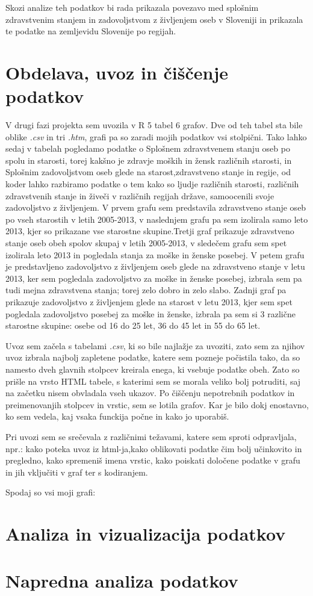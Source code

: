 \documentclass[11pt,a4paper]{article}
\begin{document}
Skozi analize teh podatkov bi rada prikazala povezavo med splošnim zdravstvenim stanjem in zadovoljstvom z življenjem oseb v Sloveniji in prikazala te podatke na zemljevidu Slovenije po regijah.
\newpage
\section{Obdelava, uvoz in čiščenje podatkov}
V drugi fazi projekta sem uvozila v R 5 tabel 6 grafov. Dve od teh tabel sta bile oblike \textit{.csv} in tri \textit{.htm}, grafi pa so zaradi mojih podatkov vsi stolpični. Tako lahko sedaj v tabelah pogledamo podatke o Splošnem zdravstvenem stanju oseb po spolu in starosti, torej kakšno je zdravje moških in žensk različnih starosti, in Splošnim zadovoljstvom oseb glede na starost,zdravstveno stanje in regije, od koder lahko razbiramo podatke o tem kako so ljudje različnih starosti, različnih zdravstvenih stanje in živeči v različnih regijah države, samoocenili svoje zadovoljstvo z življenjem. V prvem grafu sem predstavila zdravstveno stanje oseb po vseh starostih v letih 2005-2013, v naslednjem grafu pa sem izolirala samo leto 2013, kjer so prikazane vse starostne skupine.Tretji graf prikazuje zdravstveno stanje oseb obeh spolov skupaj v letih 2005-2013, v sledečem grafu sem spet izolirala leto 2013 in pogledala stanja za moške in ženske posebej. V petem grafu je predstavljeno zadovoljstvo z življenjem oseb glede na zdravstveno stanje v letu 2013, ker sem pogledala zadovoljstvo za moške in ženske posebej, izbrala sem pa tudi mejna zdravstvena stanja; torej zelo dobro in zelo slabo. Zadnji graf pa prikazuje zadovoljstvo z življenjem glede na starost v letu 2013, kjer sem spet pogledala zadovoljstvo posebej za moške in ženske, izbrala pa sem si 3 različne starostne skupine: osebe od 16 do 25 let, 36 do 45 let in 55 do 65 let.

Uvoz sem začela s tabelami \textit{.csv}, ki so bile najlažje za uvoziti, zato sem za njihov uvoz izbrala najbolj zapletene podatke, katere sem pozneje počistila tako, da so namesto dveh glavnih stolpcev kreirala enega, ki vsebuje podatke obeh. Zato so prišle na vrsto HTML tabele, s katerimi sem se morala veliko bolj potruditi, saj na začetku nisem obvladala vseh ukazov. Po čiščenju nepotrebnih podatkov in preimenovanjih stolpcev in vrstic, sem se lotila grafov. Kar je bilo dokj enostavno, ko sem vedela, kaj vsaka funckija počne in kako jo uporabiš.

 Pri uvozi sem se srečevala z različnimi težavami, katere sem sproti odpravljala, npr.: kako poteka uvoz iz html-ja,kako oblikovati podatke čim bolj učinkovito in pregledno, kako spremeniš imena vrstic, kako poiskati določene podatke v grafu in jih vključiti v graf ter s kodiranjem.

Spodaj so vsi moji grafi:



\section{Analiza in vizualizacija podatkov}


\section{Napredna analiza podatkov}

\end{document}

